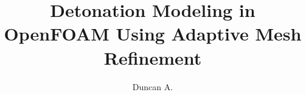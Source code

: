\documentclass[defaultstyle,12pt]{thesis}
\title{Detonation Modeling in OpenFOAM Using Adaptive Mesh Refinement}
\author{Duncan A.}{McGough}
\begin{document}
 




%

\nocite{*}		%

%
%
\end{document}
